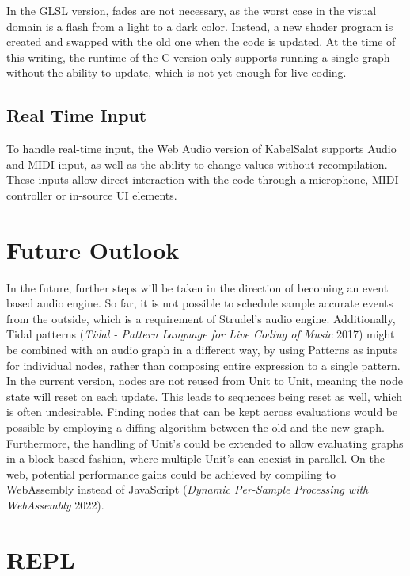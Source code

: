 \documentclass[11pt,]{article}
\makeatletter
\newcommand*\pandocbounded[1]{%
  \sbox\pandoc@box{#1}%
  \Gscale@div\@tempa{\textheight}{\dimexpr\ht\pandoc@box+\dp\pandoc@box\relax}%
  \Gscale@div\@tempb{\linewidth}{\wd\pandoc@box}%
  \ifdim\@tempb\p@<\@tempa\p@\let\@tempa\@tempb\fi%
  \ifdim\@tempa\p@<\p@\scalebox{\@tempa}{\usebox\pandoc@box}%
  \else\usebox{\pandoc@box}%
  \fi%
}
\makeatother
\begin{document}
In the GLSL version, fades are not necessary, as the worst case in the
visual domain is a flash from a light to a dark color. Instead, a new
shader program is created and swapped with the old one when the code is
updated. At the time of this writing, the runtime of the C version only
supports running a single graph without the ability to update, which is
not yet enough for live coding.

\subsection{Real Time Input}\label{real-time-input}

To handle real-time input, the Web Audio version of KabelSalat supports
Audio and MIDI input, as well as the ability to change values without
recompilation. These inputs allow direct interaction with the code
through a microphone, MIDI controller or in-source UI elements.

\pandocbounded{\texttt{[image: ./images/repl.png]}}

\section{Future Outlook}\label{future-outlook}

In the future, further steps will be taken in the direction of becoming
an event based audio engine. So far, it is not possible to schedule
sample accurate events from the outside, which is a requirement of
Strudel's audio engine. Additionally, Tidal patterns (\emph{Tidal -
Pattern Language for Live Coding of Music} 2017) might be combined with
an audio graph in a different way, by using Patterns as inputs for
individual nodes, rather than composing entire expression to a single
pattern. In the current version, nodes are not reused from Unit to Unit,
meaning the node state will reset on each update. This leads to
sequences being reset as well, which is often undesirable. Finding nodes
that can be kept across evaluations would be possible by employing a
diffing algorithm between the old and the new graph. Furthermore, the
handling of Unit's could be extended to allow evaluating graphs in a
block based fashion, where multiple Unit's can coexist in parallel. On
the web, potential performance gains could be achieved by compiling to
WebAssembly instead of JavaScript (\emph{Dynamic Per-Sample Processing
with WebAssembly} 2022).

\section{REPL}\label{repl}
\end{document}
